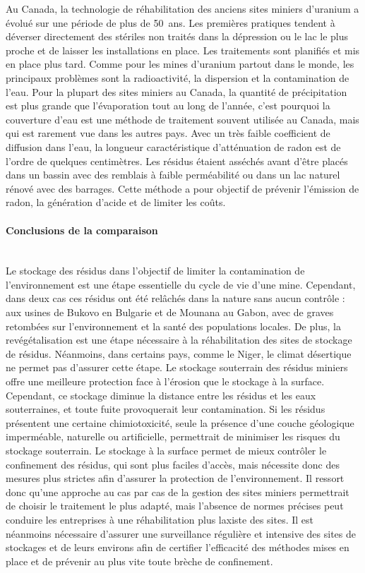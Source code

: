 \documentclass{article}
\begin{document}
Au Canada, la technologie de réhabilitation des anciens sites miniers d'uranium a évolué sur une période de plus de 50~ans. Les premières pratiques tendent à déverser directement des stériles non traités dans la dépression ou le lac le plus proche et de laisser les installations en place. Les traitements sont planifiés et mis en place plus tard. Comme pour les mines d'uranium partout dans le monde, les principaux problèmes sont la radioactivité, la dispersion et la contamination de l'eau.
Pour la plupart des sites miniers au Canada, la quantité de précipitation est plus grande que l'évaporation tout au long de l'année, c’est pourquoi la couverture d’eau est une méthode de traitement souvent utilisée au Canada, mais qui est rarement vue dans les autres pays. Avec un très faible coefficient de diffusion dans l’eau, la longueur caractéristique d’atténuation de radon est de l'ordre de quelques centimètres.
Les résidus étaient asséchés avant d'être placés dans un bassin avec des remblais à faible perméabilité ou dans un lac naturel rénové avec des barrages. Cette méthode a pour objectif de prévenir l’émission de radon, la génération d’acide et de limiter les coûts.


\paragraph{Conclusions de la comparaison \\ \\}
Le stockage des résidus dans l’objectif de limiter la contamination de l’environnement est une étape essentielle du cycle de vie d’une mine. Cependant, dans deux cas ces résidus ont été relâchés dans la nature sans aucun contrôle : aux usines de Bukovo en Bulgarie et de Mounana au Gabon, avec de graves retombées sur l’environnement et la santé des populations locales.
De plus, la revégétalisation est une étape nécessaire à la réhabilitation des sites de stockage de résidus. Néanmoins, dans certains pays, comme le Niger, le climat désertique ne permet pas d’assurer cette étape.
Le stockage souterrain des résidus miniers offre une meilleure protection face à l’érosion que le stockage à la surface. Cependant, ce stockage diminue la distance entre les résidus et les eaux souterraines, et toute fuite provoquerait leur contamination. Si les résidus présentent une certaine chimiotoxicité, seule la présence d’une couche géologique imperméable, naturelle ou artificielle, permettrait de minimiser les risques du stockage souterrain. Le stockage à la surface permet de mieux contrôler le confinement des résidus, qui sont plus faciles d’accès, mais nécessite donc des mesures plus strictes afin d’assurer la protection de l’environnement.
Il ressort donc qu’une approche au cas par cas de la gestion des sites miniers permettrait de choisir le traitement le plus adapté, mais l’absence de normes précises peut conduire les entreprises à une réhabilitation plus laxiste des sites.
Il est néanmoins nécessaire d’assurer une surveillance régulière et intensive des sites de stockages et de leurs environs afin de certifier l’efficacité des méthodes mises en place et de prévenir au plus vite toute brèche de confinement.
\end{document}
